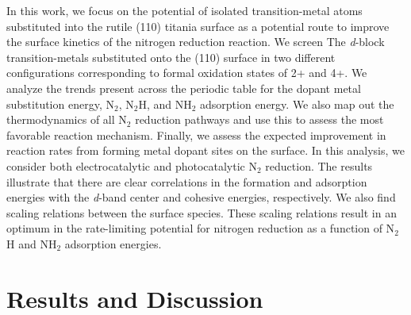 In this work, we focus on the potential of isolated transition-metal atoms substituted into the rutile (110) titania surface as a potential route to improve the surface kinetics of the nitrogen reduction reaction. We screen The \textit{d}-block transition-metals substituted onto the (110) surface in two different configurations corresponding to formal oxidation states of 2+ and 4+. 
We analyze the trends present across the periodic table for the dopant metal substitution energy, N$_2$, N$_2$H, and NH$_2$ adsorption energy. We also map out the thermodynamics of all N$_2$ reduction pathways and use this to assess the most favorable reaction mechanism. Finally, we assess the expected improvement in reaction rates from forming metal dopant sites on the surface. In this analysis, we consider both electrocatalytic and photocatalytic N$_2$ reduction. The results illustrate that there are clear correlations in the formation and adsorption energies with the \textit{d}-band center and cohesive energies, respectively. We also find scaling relations between the surface species. These scaling relations result in an optimum in the rate-limiting potential for nitrogen reduction as a function of N$_2$H and NH$_2$ adsorption energies. %

\section{Results and Discussion}

